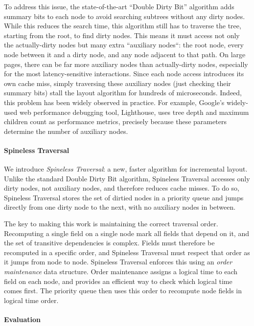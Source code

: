 To address this issue,
  the state-of-the-art ``Double Dirty Bit'' algorithm
  adds summary bits to each node
  to avoid searching subtrees without any dirty nodes.
While this reduces the search time,
  this algorithm still has to traverse the tree,
  starting from the root, to find dirty nodes.
This means it must access not only the actually-dirty nodes
  but many extra ``auxiliary nodes``:
  the root node, every node between it and a dirty node,
  and any node adjacent to that path.
On large pages, there can be far more auxiliary nodes
  than actually-dirty nodes,
  especially for the most latency-sensitive interactions.
Since each node access introduces its own cache miss,
  simply traversing these auxiliary nodes
  (just checking their summary bits)
  stall the layout algorithm for hundreds of microseconds.
Indeed, this problem has been widely observed in practice.
For example,
  Google's widely-used web performance debugging tool, Lighthouse,
  uses tree depth and maximum children count as performance metrics,
  precisely because these parameters
  determine the number of auxiliary nodes.

\paragraph{Spineless Traversal}

We introduce \textit{Spineless Traversal}:
  a new, faster algorithm for incremental layout.
Unlike the standard Double Dirty Bit algorithm,
  Spineless Traversal accesses only dirty nodes, not auxiliary nodes,
  and therefore reduces cache misses.
To do so, Spineless Traversal
  stores the set of dirtied nodes in a priority queue
  and jumps directly from one dirty node to the next,
  with no auxiliary nodes in between.

The key to making this work is maintaining the correct traversal order. 
Recomputing a single field on a single node mark all fields that depend on it,
  and the set of transitive dependencies is complex.
Fields must therefore be recomputed in a specific order,
  and Spineless Traversal must respect that order
  as it jumps from node to node.
Spineless Traversal enforces this
  using an \emph{order maintenance} data structure.
Order maintenance assigns a logical time to each field on each node,
  and provides an efficient way to check which logical time comes first.
The priority queue then uses this order
  to recompute node fields in logical time order.

\paragraph{Evaluation}

